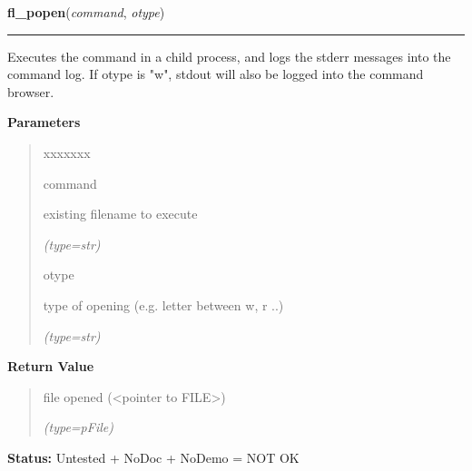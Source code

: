 \hspace{.8\funcindent}\begin{boxedminipage}{\funcwidth}

    \raggedright \textbf{fl\_popen}(\textit{command}, \textit{otype})

    \vspace{-1.5ex}

    \rule{\textwidth}{0.5\fboxrule}
\setlength{\parskip}{2ex}
    Executes the command in a child process, and logs the stderr messages 
    into the command log. If otype is "w", stdout will also be logged into 
    the command browser.

\setlength{\parskip}{1ex}
      \textbf{Parameters}
      \vspace{-1ex}

      \begin{quote}
        \begin{Ventry}{xxxxxxx}

          \item[command]

          existing filename to execute

            {\it (type=str)}

          \item[otype]

          type of opening (e.g. letter between w, r ..)

            {\it (type=str)}

        \end{Ventry}

      \end{quote}

      \textbf{Return Value}
    \vspace{-1ex}

      \begin{quote}
      file opened ({\textless}pointer to FILE{\textgreater})

      {\it (type=pFile)}

      \end{quote}

\textbf{Status:} Untested + NoDoc + NoDemo = NOT OK



    \end{boxedminipage}

    \label{xformslib:flgoodies:fl_pclose}

